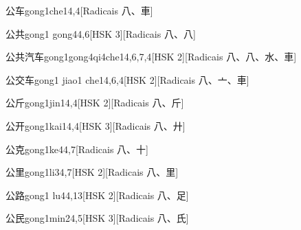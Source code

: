 \begin{entry}{公车}{gong1che1}{4,4}[Radicais ⼋、⾞]
\end{entry}

\begin{entry}{公共}{gong1 gong4}{4,6}[HSK 3][Radicais ⼋、⼋]
\end{entry}

\begin{entry}{公共汽车}{gong1gong4qi4che1}{4,6,7,4}[HSK 2][Radicais ⼋、⼋、⽔、⾞]
\end{entry}

\begin{entry}{公交车}{gong1 jiao1 che1}{4,6,4}[HSK 2][Radicais ⼋、⼇、⾞]
\end{entry}

\begin{entry}{公斤}{gong1jin1}{4,4}[HSK 2][Radicais ⼋、⽄]
\end{entry}

\begin{entry}{公开}{gong1kai1}{4,4}[HSK 3][Radicais ⼋、⼶]
\end{entry}

\begin{entry}{公克}{gong1ke4}{4,7}[Radicais ⼋、⼗]
\end{entry}

\begin{entry}{公里}{gong1li3}{4,7}[HSK 2][Radicais ⼋、⾥]
\end{entry}

\begin{entry}{公路}{gong1 lu4}{4,13}[HSK 2][Radicais ⼋、⾜]
\end{entry}

\begin{entry}{公民}{gong1min2}{4,5}[HSK 3][Radicais ⼋、⽒]
\end{entry}


